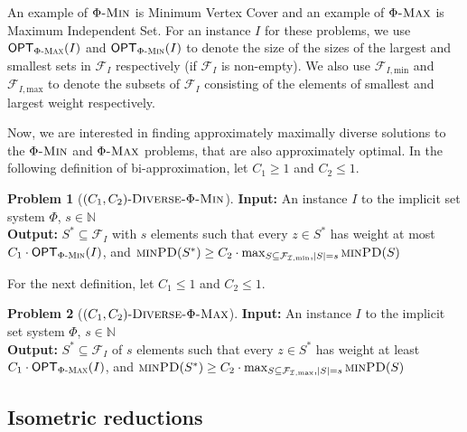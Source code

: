 \documentclass[11pt, letterpaper]{article}
\theoremstyle{definition}
\newtheorem{problem}{Problem}
\newcommand{\calf}{\mathcal{F}}
\newcommand{\phimax}{\Phi\textsc{-Max}}
\newcommand{\phimin}{\Phi\textsc{-Min}}
\newcommand{\divmin}{\textsc{Diverse-}\Phi\textsc{-Min}}
\newcommand{\divmax}{\textsc{Diverse-}\Phi\textsc{-Max}}
\newcommand{\OPT}{\textsf{OPT}}
\newcommand{\PD}{\textsc{minPD}}
\newcommand{\IN}{\ensuremath{\mathbb{N}}}
\begin{document}
An example of $\Phi\textsc{-Min}$ is Minimum Vertex Cover and an example of $\Phi\textsc{-Max}$ is Maximum Independent Set. For an instance $I$ for these problems, we use $\OPT_{\phimax}(I)$ and $\OPT_{\phimin}(I)$ to denote the size of the sizes of the largest and smallest sets in $\mathcal{F}_I$ respectively (if $\mathcal{F}_I$ is non-empty). We also use $\calf_{I, \text{min}}$ and $\calf_{I, \text{max}}$ to denote the subsets of $\calf_{I}$ consisting of the elements of smallest and largest weight respectively.

Now, we are interested in finding approximately maximally diverse solutions to the $\Phi\textsc{-Min}$ and $\Phi\textsc{-Max}$ problems, that are also approximately optimal. In the following definition of bi-approximation, let $C_1 \geq 1$ and $C_2 \leq 1$.
\begin{problem}[$(C_1, C_2)\text{-}\divmin$]
    \textbf{Input:} An instance $I$ to the implicit set system $\Phi$, $s \in \IN$ \\
    \textbf{Output:} $S^* \subseteq \mathcal{F}_I$ with $s$ elements such that every $z \in S^*$ has weight at most $C_1 \cdot \OPT_{\phimin} (I)$, and $\PD(S^*)  \geq C_2 \cdot \max_{S \subseteq \mathcal{F_{I, \text{min}}}, |S|=s} \PD(S)$
\end{problem}

\noindent
For the next definition, let $C_1 \leq 1$ and $C_2 \leq 1$.

\begin{problem}[$(C_1, C_2)\text{-}\divmax$]
    \textbf{Input:} An instance $I$ to the implicit set system $\Phi$, $s \in \IN$ \\
    \textbf{Output:} $S^* \subseteq \mathcal{F}_I$ of $s$ elements such that every $z \in S^*$ has weight at least $C_1 \cdot  \OPT_{\phimax} (I)$, and $\PD(S^*)  \geq C_2 \cdot \max_{S \subseteq \mathcal{F_{I, \text{max}}}, |S|=s} \PD(S)$
\end{problem} 

\subsection{Isometric reductions}\label{sec:isometric}
\end{document}
